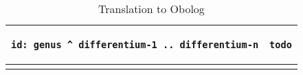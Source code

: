 \begin{scriptsize}
\begin{longtable}{ | p{7cm} | p{7cm} |}

\hline
\begin{verbatim}
id: genus ^ differentium-1 .. differentium-n
\end{verbatim}
&
\begin{verbatim}
todo
\end{verbatim}
\\


\hline
\caption{Translation to Obolog}
\end{longtable}
\end{scriptsize}




